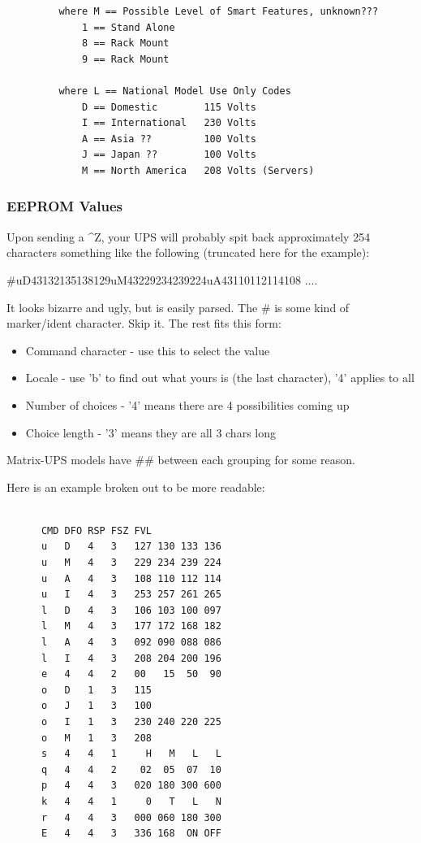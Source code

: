{{{{{{{{{{{{{{{{{\begin{verbatim}
         where M == Possible Level of Smart Features, unknown???
             1 == Stand Alone
             8 == Rack Mount
             9 == Rack Mount
     
         where L == National Model Use Only Codes
             D == Domestic        115 Volts
             I == International   230 Volts
             A == Asia ??         100 Volts
             J == Japan ??        100 Volts
             M == North America   208 Volts (Servers)
\end{verbatim}
\normalsize

\label{EEPROM-Values}

\subsubsection*{EEPROM Values}

Upon sending a \^{}Z, your UPS will probably spit back approximately 254
characters something like the following (truncated here for the example):  

\#uD43132135138129uM43229234239224uA43110112114108 ....  

It looks bizarre and ugly, but is easily parsed. The \# is some kind of
marker/ident character. Skip it. The rest fits this form:  

\begin{itemize}
\item Command character - use this to select the value  
\item Locale - use 'b' to find out what yours is (the last character), '4'
applies to all  
\item Number of choices - '4' means there are 4 possibilities coming up  
\item Choice length - '3' means they are all 3 chars long 
\end{itemize}

Matrix-UPS models have \#\# between each grouping for some reason.  

Here is an example broken out to be more readable: 

\footnotesize
\begin{verbatim}
     
      CMD DFO RSP FSZ FVL
      u   D   4   3   127 130 133 136
      u   M   4   3   229 234 239 224
      u   A   4   3   108 110 112 114
      u   I   4   3   253 257 261 265
      l   D   4   3   106 103 100 097
      l   M   4   3   177 172 168 182
      l   A   4   3   092 090 088 086
      l   I   4   3   208 204 200 196
      e   4   4   2   00   15  50  90
      o   D   1   3   115
      o   J   1   3   100
      o   I   1   3   230 240 220 225
      o   M   1   3   208
      s   4   4   1     H   M   L   L
      q   4   4   2    02  05  07  10
      p   4   4   3   020 180 300 600
      k   4   4   1     0   T   L   N
      r   4   4   3   000 060 180 300
      E   4   4   3   336 168  ON OFF
     

\end{verbatim}}}}}}}}}}}}}}}}}}
